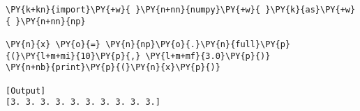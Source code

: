 \begin{Verbatim}[label=\makebox{\href{https://github.com/unipi-physics-labs/lab1-notes/tree/main/snippy/np.full.py}{https://github.com/.../np.full.py}},commandchars=\\\{\}]
\PY{k+kn}{import}\PY{+w}{ }\PY{n+nn}{numpy}\PY{+w}{ }\PY{k}{as}\PY{+w}{ }\PY{n+nn}{np}

\PY{n}{x} \PY{o}{=} \PY{n}{np}\PY{o}{.}\PY{n}{full}\PY{p}{(}\PY{l+m+mi}{10}\PY{p}{,} \PY{l+m+mf}{3.0}\PY{p}{)}
\PY{n+nb}{print}\PY{p}{(}\PY{n}{x}\PY{p}{)}

[Output]
[3. 3. 3. 3. 3. 3. 3. 3. 3. 3.]
\end{Verbatim}
